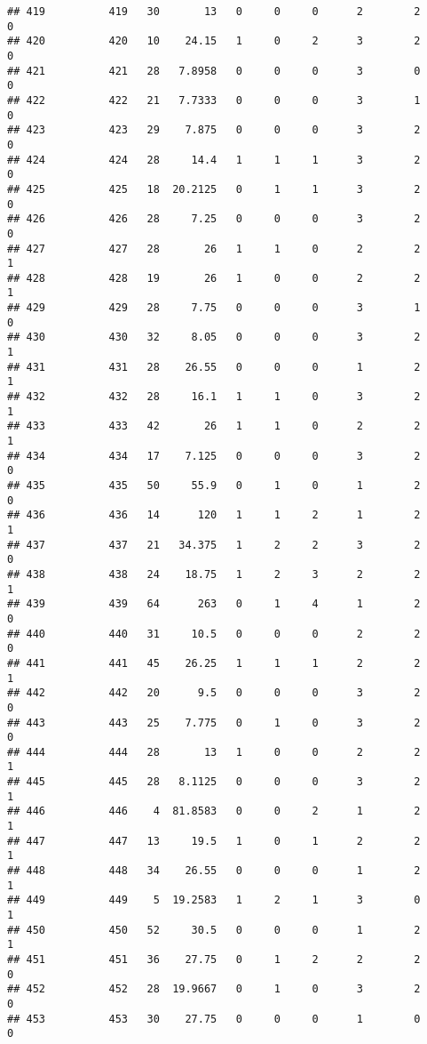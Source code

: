 \documentclass[
]{article}
\begin{document}
\begin{verbatim}
## 419          419   30       13   0     0     0      2        2         0
## 420          420   10    24.15   1     0     2      3        2         0
## 421          421   28   7.8958   0     0     0      3        0         0
## 422          422   21   7.7333   0     0     0      3        1         0
## 423          423   29    7.875   0     0     0      3        2         0
## 424          424   28     14.4   1     1     1      3        2         0
## 425          425   18  20.2125   0     1     1      3        2         0
## 426          426   28     7.25   0     0     0      3        2         0
## 427          427   28       26   1     1     0      2        2         1
## 428          428   19       26   1     0     0      2        2         1
## 429          429   28     7.75   0     0     0      3        1         0
## 430          430   32     8.05   0     0     0      3        2         1
## 431          431   28    26.55   0     0     0      1        2         1
## 432          432   28     16.1   1     1     0      3        2         1
## 433          433   42       26   1     1     0      2        2         1
## 434          434   17    7.125   0     0     0      3        2         0
## 435          435   50     55.9   0     1     0      1        2         0
## 436          436   14      120   1     1     2      1        2         1
## 437          437   21   34.375   1     2     2      3        2         0
## 438          438   24    18.75   1     2     3      2        2         1
## 439          439   64      263   0     1     4      1        2         0
## 440          440   31     10.5   0     0     0      2        2         0
## 441          441   45    26.25   1     1     1      2        2         1
## 442          442   20      9.5   0     0     0      3        2         0
## 443          443   25    7.775   0     1     0      3        2         0
## 444          444   28       13   1     0     0      2        2         1
## 445          445   28   8.1125   0     0     0      3        2         1
## 446          446    4  81.8583   0     0     2      1        2         1
## 447          447   13     19.5   1     0     1      2        2         1
## 448          448   34    26.55   0     0     0      1        2         1
## 449          449    5  19.2583   1     2     1      3        0         1
## 450          450   52     30.5   0     0     0      1        2         1
## 451          451   36    27.75   0     1     2      2        2         0
## 452          452   28  19.9667   0     1     0      3        2         0
## 453          453   30    27.75   0     0     0      1        0         0

\end{verbatim}
\end{document}
